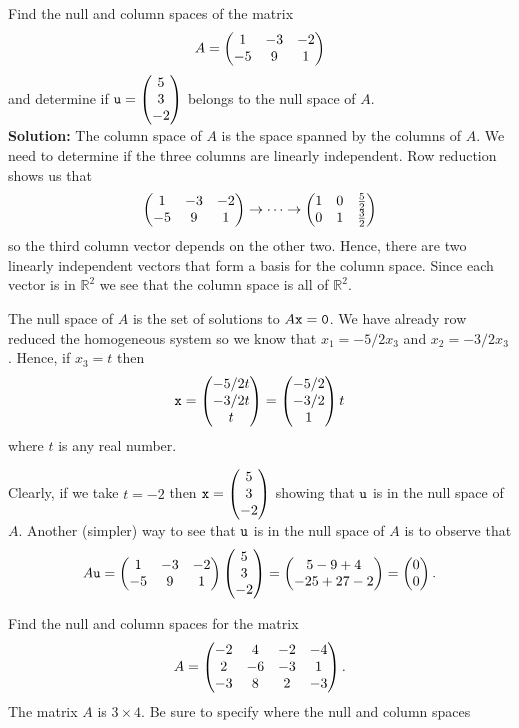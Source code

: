 \begin{example}
Find the null and column spaces of the matrix 
\[ A = \begin{pmatrix} 1 & -3 & -2 \\ -5 & 9 & 1 \end{pmatrix} \]
and determine if $\texttt{u} = \begin{pmatrix} 5\\3\\-2\end{pmatrix}$ belongs to the null space of $A$.
\\{\bf Solution:}
The column space of $A$ is the space spanned by the columns of $A$.  We need to determine
if the three columns are linearly independent.  Row reduction shows us that
\[ \begin{pmatrix} 1 & -3 & -2 \\ -5 & 9 & 1 \end{pmatrix} \to \cdots \to \begin{pmatrix} 1 & 0 & \frac{5}{2} \\ 0 & 1 &
\frac{3}{2} \end{pmatrix} \]
so the third column vector depends on the other two.  Hence, there are two linearly
independent vectors that form a basis for the column space.  Since each vector is in
$\mathbb{R}^2$ we see that the column space is all of $\mathbb{R}^2$.

The null space of $A$ is the set of solutions to $A\texttt{x} =\texttt{0}$. We have already row reduced
the homogeneous system so we know that $x_1 = -5/2 x_3$ and $x_2 = -3/2 x_3$.  Hence, if
$x_3 = t$ then
\[ \texttt{x} = \begin{pmatrix} -5/2 t \\ -3/2 t \\ t \end{pmatrix} = \begin{pmatrix} -5/2 \\ -3/2 \\ 1 \end{pmatrix} t \]
where $t$ is any real number.

Clearly, if we take $t=-2$ then $\texttt{x} = \begin{pmatrix} 5\\3\\-2 \end{pmatrix}$ showing that $\texttt{u}$ is in the
null space of $A$.  Another (simpler) way to see that $\texttt{u}$ is in the null space of $A$ is
to observe that 
\[ A\texttt{u} = \begin{pmatrix} 1&-3&-2\\-5&9&1\end{pmatrix} \begin{pmatrix} 5\\3\\-2\end{pmatrix} = \begin{pmatrix} 5-9+4 \\ -25+27-2\end{pmatrix} =
\begin{pmatrix}0\\0\end{pmatrix}.\]
\end{example}

% 
\begin{problem}
Find the null and column spaces for the matrix 
\[ A = \begin{pmatrix} -2 & 4 & -2 & -4 \\ 2 & -6 & -3 & 1 \\ -3 & 8 & 2 & -3 \end{pmatrix}. \]
The matrix $A$ is $3 \times 4$.  Be sure to specify where the null and column spaces

\end{problem}



